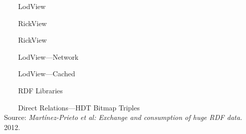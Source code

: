 \documentclass[14pt,aspectratio=169]{beamer}
\newcommand{\imageslide}[4][]
{
\begin{frame}[plain]{~~~~#2}
\vspace{0.2em}
\centering\makebox[\linewidth]{\texttt{[image: \#3]}}
\\#1
\note{#4}
\end{frame}
}
\begin{document}

\imageslide{LodView}{img/lodview-screenshot.png}{}
\imageslide{RickView}{img/rickview-screenshot1.png}{}
\imageslide{RickView}{img/rickview-screenshot2.png}{}

\imageslide{LodView---Network}{img/lodview-nocache.png}{}
\imageslide{LodView---Cached}{img/lodview-cache.png}{}

\imageslide{RDF Libraries}{img/libraries.png}{}

\imageslide[\footnotesize Source: \emph{Martínez-Prieto et al: Exchange and consumption of huge RDF data.} 2012.]{Direct Relations---HDT Bitmap Triples}{img/bt.png}{}
\end{document}
